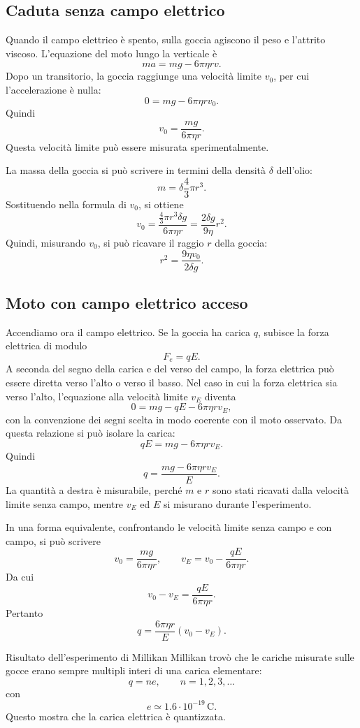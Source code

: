 \documentclass[a4paper]{article}
\begin{document}
\subsection{Caduta senza campo elettrico}

Quando il campo elettrico è spento, sulla goccia agiscono il peso e l'attrito viscoso. L'equazione del moto lungo la verticale è
\[
    ma=mg-6\pi\eta rv.
\]
Dopo un transitorio, la goccia raggiunge una velocità limite \(v_0\), per cui l'accelerazione è nulla:
\[
    0=mg-6\pi\eta rv_0.
\]
Quindi
\[
    v_0=\frac{mg}{6\pi\eta r}.
\]
Questa velocità limite può essere misurata sperimentalmente.

La massa della goccia si può scrivere in termini della densità \(\delta\) dell'olio:
\[
    m=\delta\frac{4}{3}\pi r^3.
\]
Sostituendo nella formula di \(v_0\), si ottiene
\[
    v_0=\frac{\frac{4}{3}\pi r^3\delta g}{6\pi\eta r}
    =\frac{2\delta g}{9\eta}r^2.
\]
Quindi, misurando \(v_0\), si può ricavare il raggio \(r\) della goccia:
\[
    r^2=\frac{9\eta v_0}{2\delta g}.
\]

\subsection{Moto con campo elettrico acceso}

Accendiamo ora il campo elettrico. Se la goccia ha carica \(q\), subisce la forza elettrica di modulo
\[
    F_e=qE.
\]
A seconda del segno della carica e del verso del campo, la forza elettrica può essere diretta verso l'alto o verso il basso. Nel caso in cui la forza elettrica sia verso l'alto, l'equazione alla velocità limite \(v_E\) diventa
\[
    0=mg-qE-6\pi\eta rv_E,
\]
con la convenzione dei segni scelta in modo coerente con il moto osservato. Da questa relazione si può isolare la carica:
\[
    qE=mg-6\pi\eta rv_E.
\]
Quindi
\[
    q=\frac{mg-6\pi\eta rv_E}{E}.
\]
La quantità a destra è misurabile, perché \(m\) e \(r\) sono stati ricavati dalla velocità limite senza campo, mentre \(v_E\) ed \(E\) si misurano durante l'esperimento.

In una forma equivalente, confrontando le velocità limite senza campo e con campo, si può scrivere
\[
    v_0=\frac{mg}{6\pi\eta r},
    \qquad
    v_E=v_0-\frac{qE}{6\pi\eta r}.
\]
Da cui
\[
    v_0-v_E=\frac{qE}{6\pi\eta r}.
\]
Pertanto
\[
    q=\frac{6\pi\eta r}{E}(v_0-v_E).
\]

\begin{snippettheorem}{Risultato dell'esperimento di Millikan}
    Millikan trovò che le cariche misurate sulle gocce erano sempre multipli interi di una carica elementare:
    \[
        q=ne,
        \qquad
        n=1,2,3,\dots
    \]
    con
    \[
        e\simeq 1.6\cdot 10^{-19}\,\mathrm{C}.
    \]
    Questo mostra che la carica elettrica è quantizzata.
\end{snippettheorem}
\end{document}
